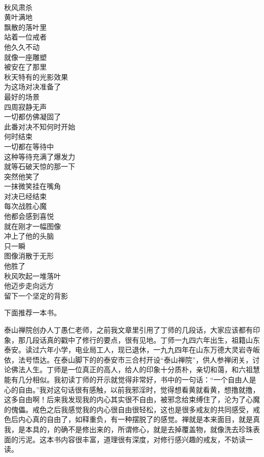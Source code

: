 \begin{poem}[秋风中的对决]
    \begin{multicols}{4}
        \begin{center}~\\
            秋风肃杀 \\ 黄叶满地 \\ 飘散的落叶里 \\ 站着一位戒者 \\ 他久久不动 \\ 就像一座雕塑 \\ 被安在了那里 \\ 秋天特有的光影效果 \\ 为这场对决准备了 \\ 最好的场景 \\ 四周寂静无声 \\ 一切都仿佛凝固了 \\ 此番对决不知何时开始 \\ 何时结束 \\ 一切都在等待中 \\ 这种等待充满了爆发力 \\ 就等石破天惊的那一下 \\ 突然他笑了 \\ 一抹微笑挂在嘴角 \\ 对决已经结束 \\ 每次战胜心魔 \\ 他都会感到喜悦 \\ 就在刚才一幅图像 \\ 冲上了他的头脑 \\ 只一瞬 \\ 图像消散于无形 \\ 他胜了 \\ 秋风吹起一堆落叶 \\ 他迈步走向远方 \\ 留下一个坚定的背影
        \end{center}
    \end{multicols}
\end{poem}

下面推荐一本书。

\begin{book}
    泰山禅院创办人丁愚仁老师，之前我文章里引用了丁师的几段话，大家应该都有印象，那几段话真的戳中了修行的要点，很有见地。丁师一九四六年出生，祖籍山东泰安。读过六年小学，电业局工人，现已退休，一九九四年在山东万德大灵岩寺皈依，法号悟达。在泰山脚下的的泰安市三合村开设“泰山禅院”，供人参禅闭关，讨论佛法人生。丁师是一位真正的高人，给人的印象十分质朴，亲切和蔼，和六祖慧能有几分相似。我初读丁师的开示就觉得非常好，书中的一句话：“一个自由人是心的自由。”我对这句话很有感触，以前我邪淫时，觉得想看黄就看黄，想撸就撸，这多自由啊！后来我发现我的内心其实很不自由，被邪念给束缚住了，沦为了心魔的傀儡。戒色之后我感觉我的内心很自由很轻松，这也是很多戒友的共同感受，戒色后内心真的自由了，如释重负，有一种摆脱了的感觉。禅就是本来面目，就是真我，是本具的，的确不是修出来的，所谓修心，就是去掉覆盖物，就像洗去珍珠表面的污泥。这本书内容很丰富，道理很有深度，对修行感兴趣的戒友，不妨读一读。
\end{book}
